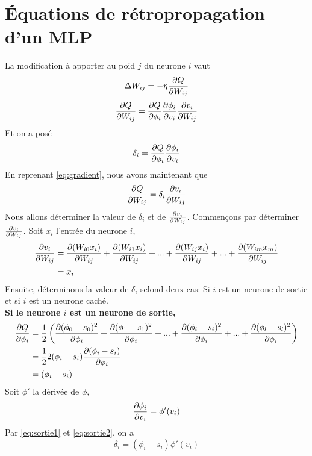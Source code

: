 \section{Équations de rétropropagation d'un MLP}\label{sec:eqmlp}
La modification à apporter au poid $j$ du neurone $i$ vaut
\begin{equation}\label{eq:Delta}
 \Delta W_{ij} = -\eta\frac{\partial Q}{\partial W_{ij}}
\end{equation}
\begin{equation}\label{eq:gradient}
 \frac{\partial Q}{\partial W_{ij}} = \frac{\partial Q}{\partial \phi_i} \frac{\partial \phi_i}{\partial v_i} \frac{\partial v_i}{\partial W_{ij}}
\end{equation}
Et on a posé
\begin{equation}\label{eq:deltai}
 \delta_i = \frac{\partial Q}{\partial \phi_i} \frac{\partial \phi_i}{\partial v_i}
\end{equation}
En reprenant \eqref{eq:gradient}, nous avons maintenant que
\begin{equation}\label{eq:graddelta}
 \frac{\partial Q}{\partial W_{ij}} = \delta_i \frac{\partial v_i}{\partial W_{ij}}
\end{equation}
Nous allons déterminer la valeur de $\delta_i$ et de $\frac{\partial v_i}{\partial W_{ij}}$.
Commençons par déterminer $\frac{\partial v_i}{\partial W_{ij}}$.
Soit $x_i$ l'entrée du neurone $i$,
\begin{equation}\label{eq:gradsum}
 \begin{split}
  \frac{\partial v_i}{\partial W_{ij}} & = \frac{\partial (W_{i0}x_i)}{\partial W_{ij}} + \frac{\partial (W_{i1}x_i)}{\partial W_{ij}} + ... + \frac{\partial (W_{ij}x_i)}{\partial W_{ij}} + ... + \frac{\partial (W_{im}x_m)}{\partial W_{ij}}\\
  ~ & = x_i
  \end{split}
\end{equation}
Ensuite, déterminons la valeur de $\delta_i$ selond deux cas: Si $i$ est un neurone de sortie et si $i$ est un neurone caché.\\

\textbf{Si le neurone $i$ est un neurone de sortie,}
\begin{equation}\label{eq:sortie1}
 \begin{split}
  \frac{\partial Q}{\partial \phi_i} & = \frac{1}{2} \left( \frac{\partial (\phi_0 - s_0)^2}{\partial \phi_i} + \frac{\partial (\phi_1 - s_1)^2}{\partial \phi_i} + ... + \frac{\partial (\phi_i - s_i)^2}{\partial \phi_i} + ... + \frac{\partial (\phi_l - s_l)^2}{\partial \phi_i} \right)\\
  ~ & = \frac{1}{2}2(\phi_i - s_i)\frac{\partial (\phi_i - s_i)}{\partial \phi_i}\\
  ~ & = (\phi_i - s_i)
 \end{split}
\end{equation}
Soit $\phi'$ la dérivée de $\phi$,
\begin{equation}\label{eq:sortie2}
 \frac{\partial \phi_i}{\partial v_i} = \phi'(v_i)
\end{equation}
Par \eqref{eq:sortie1} et \eqref{eq:sortie2}, on a
\[\delta_i = (\phi_i - s_i)\phi'(v_i)\]\\

